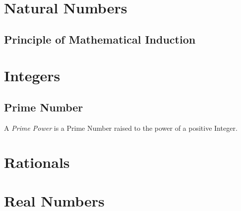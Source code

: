 \documentclass{article}
\begin{document}
\section{Natural Numbers}\label{sec:natural_number}

\subsection{Principle of Mathematical Induction}
\label{subsec:induction_principle}



\section{Integers}\label{sec:integer}

\subsection{Prime Number}\label{subsec:prime_number}

A \emph{Prime Power} is a Prime Number raised to the power of a
positive Integer.



\section{Rationals}\label{sec:rational}



\section{Real Numbers}\label{sec:real_number}
\end{document}

